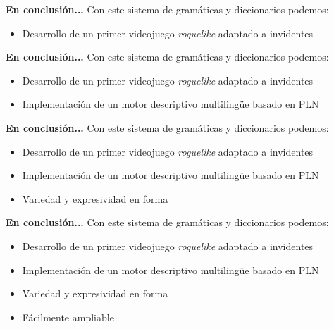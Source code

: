 
\begin{tframe}{\textbf{En conclusión...}}
	Con este sistema de gramáticas y diccionarios podemos:
	\begin{itemize}
		\item<+-| alert@+> Desarrollo de un primer videojuego \textit{roguelike} adaptado a invidentes
	\end{itemize}
\end{tframe}

\begin{tframe}{\textbf{En conclusión...}}
	Con este sistema de gramáticas y diccionarios podemos:
	\begin{itemize}
		\item Desarrollo de un primer videojuego \textit{roguelike} adaptado a invidentes
		\item<+-| alert@+> Implementación de un motor descriptivo multilingüe basado en PLN
	\end{itemize}
\end{tframe}

\begin{tframe}{\textbf{En conclusión...}}
	Con este sistema de gramáticas y diccionarios podemos:
	\begin{itemize}
		\item Desarrollo de un primer videojuego \textit{roguelike} adaptado a invidentes
		\item Implementación de un motor descriptivo multilingüe basado en PLN
		\item<+-| alert@+> Variedad y expresividad en forma
	\end{itemize}
\end{tframe}

\begin{tframe}{\textbf{En conclusión...}}
	Con este sistema de gramáticas y diccionarios podemos:
	\begin{itemize}
		\item Desarrollo de un primer videojuego \textit{roguelike} adaptado a invidentes
		\item Implementación de un motor descriptivo multilingüe basado en PLN
		\item Variedad y expresividad en forma
		\item<+-| alert@+> Fácilmente ampliable
	\end{itemize}
\end{tframe}

